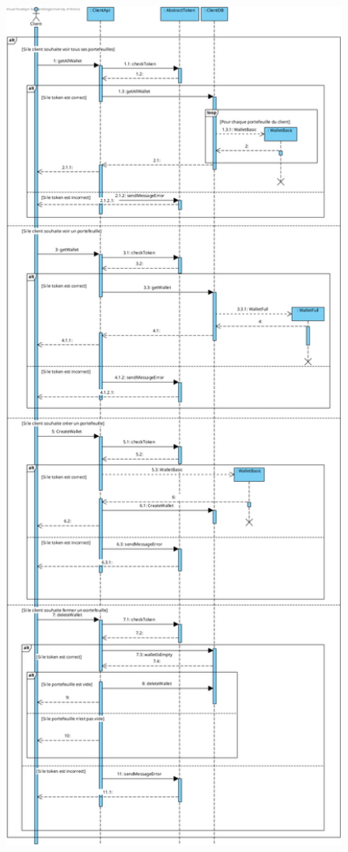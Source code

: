 \newpage
\begin{figure}[h]
\centering
\includegraphics[width = 1\textwidth]{Base/sequence/img/client/Voir les portefeuilles.png}
\end{figure}
\newpage

